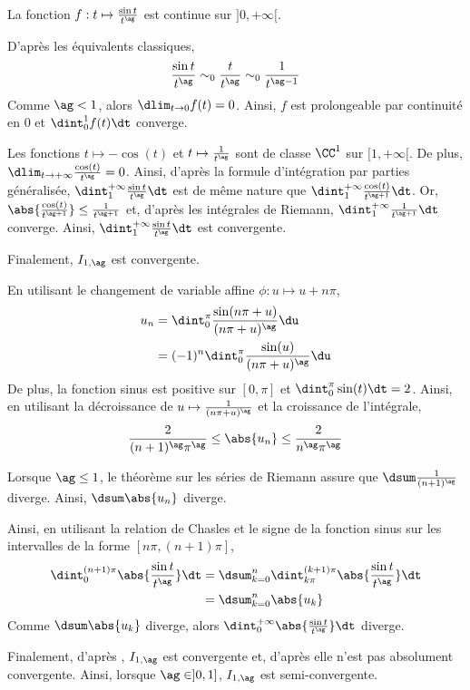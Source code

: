 \begin{solution}
\squ
\ssqu La fonction $f : t \mapsto \frac{\sin t}{t^\ag}$ est continue sur $]0, +\infty[$.

 D'après les équivalents classiques,
\[
\frac{\sin t}{t^\ag} \sim_0 \frac{t}{t^\ag} \sim_0 \frac{1}{t^{\ag-1}}
\]
Comme $\ag < 1$, alors $\dlim_{t\to0} f(t) = 0$. Ainsi, $f$ est prolongeable par continuité en $0$ et $\dint_0^1 f(t) \dt$ converge.

 Les fonctions $t \mapsto -\cos(t)$ et $t \mapsto \frac{1}{t^\ag}$ sont de classe $\CC^1$ sur $[1,+\infty[$. De plus, $\dlim_{t\to+\infty} \frac{\cos(t)}{t^\ag} = 0$. Ainsi, d'après la formule d'intégration par parties généralisée, $\dint_1^{+\infty} \frac{\sin t}{t^\ag} \dt$ est de même nature que $\dint_1^{+\infty} \frac{\cos(t)}{t^{\ag+1}} \dt$. Or, $\abs{\frac{\cos(t)}{t^{\ag+1}}} \leq \frac{1}{t^{\ag+1}}$ et, d'après les intégrales de Riemann, $\dint_1^{+\infty} \frac{1}{t^{\ag+1}} \dt$ converge. Ainsi, $\dint_1^{+\infty} \frac{\sin t}{t^{\ag}} \dt$ est convergente.

Finalement, $I_{1,\ag}$ est convergente.

\ssqu En utilisant le changement de variable affine $\phi : u \mapsto u + n \pi$,
\begin{align*}
u_n &= \dint_0^\pi \frac{\sin(n \pi + u)}{(n \pi + u)^\ag} \du\\
&= (-1)^n \dint_0^\pi \frac{\sin(u)}{(n \pi + u)^\ag} \du
\end{align*}
De plus, la fonction sinus est positive sur $[0,\pi]$ et $\dint_0^\pi \sin(t) \dt = 2$. Ainsi, en utilisant la décroissance de $u \mapsto \frac{1}{(n \pi + u)^\ag}$ et la croissance de l'intégrale,
\[
\frac{2}{(n+1)^\ag \pi^\ag} \leq \abs{u_n} \leq \frac{2}{n^\ag \pi^\ag}
\]

\ssqu Lorsque $\ag \leq 1$, le théorème sur les séries de Riemann assure que $\dsum \frac{1}{(n+1)^\ag}$ diverge. Ainsi, $\dsum \abs{u_n}$ diverge.

Ainsi, en utilisant la relation de Chasles et le signe de la fonction sinus sur les intervalles de la forme $[n\pi, (n+1)\pi]$,
\begin{align*}
\dint_0^{(n+1)\pi} \abs{\frac{\sin t}{t^\ag}} \dt &= \dsum_{k=0}^n \dint_{k\pi}^{(k+1)\pi} \abs{\frac{\sin t}{t^\ag}} \dt \\
&= \dsum_{k=0}^n \abs{u_k}
\end{align*}
Comme $\dsum \abs{u_k}$ diverge, alors $\dint_0^{+\infty} \abs{\frac{\sin t}{t^\ag}} \dt$ diverge.

Finalement, d'après , $I_{1,\ag}$ est convergente et, d'après  elle n'est pas absolument convergente. Ainsi, lorsque $\ag \in ]0,1]$, $I_{1,\ag}$ est semi-convergente.


\end{solution}
